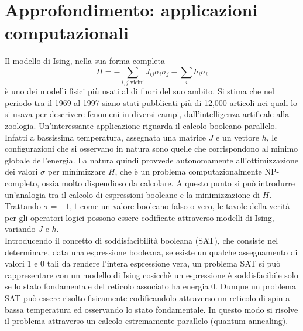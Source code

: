 \documentclass[Lau, noexaminfo, oneside]{sapthesis} %
\begin{document}
\section{Approfondimento: applicazioni computazionali}
Il modello di Ising, nella sua forma completa
\begin{equation}
H = - \sum_{i,j \text{ vicini}} J_{ij} \sigma_i \sigma_j - \sum_i h_i \sigma_i
\end{equation}
è uno dei modelli fisici più usati al di fuori del suo ambito. Si stima che nel periodo tra il 1969 al 1997 siano stati pubblicati più di 12,000 articoli nei quali lo si usava per descrivere fenomeni in diversi campi, dall'intelligenza artificale alla zoologia. \cite{dwave}
Un'interessante applicazione riguarda il calcolo booleano parallelo. Infatti a bassissima temperatura, assegnata una matrice $J$ e un vettore $h$, le configurazioni che si osservano in natura sono quelle che corrispondono al minimo globale dell'energia. La natura quindi provvede autonomamente all'ottimizzazione dei valori $\sigma$ per minimizzare $H$, che è un problema computazionalmente NP-completo, ossia molto dispendioso da calcolare. A questo punto si può introdurre un'analogia tra il calcolo di espressioni booleane e la minimizzazione di $H$. Trattando $\sigma=-1, 1$ come un valore booleano falso o vero, le tavole della verità per gli operatori logici possono essere codificate attraverso modelli di Ising, variando $J$ e $h$.\\ Introducendo il concetto di soddisfacibilità booleana (SAT), che consiste nel determinare, data una espressione booleana, se esiste un qualche assegnamento di valori 1 e 0 tali da rendere l'intera espressione vera, un problema SAT si può rappresentare con un modello di Ising cosicchè un espressione è soddisfacibile solo se lo stato fondamentale del reticolo associato ha energia 0. Dunque un problema SAT può essere risolto fisicamente codificandolo attraverso un reticolo di spin a bassa temperatura ed osservando lo stato fondamentale. In questo modo si risolve il problema attraverso un calcolo estremamente parallelo (quantum annealing).\cite{quantumannealing}
\end{document}
